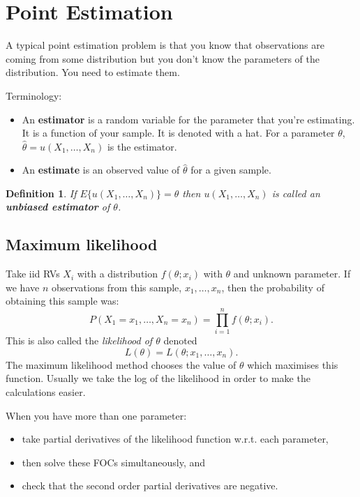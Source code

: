 \documentclass[10pt, two column]{article}
\newtheorem{definition}{Definition}[subsection]
\begin{document}
\section{Point Estimation}

A typical point estimation problem is that you know that observations are coming from some distribution but you don't know the parameters of the distribution. You need to estimate them. 

Terminology:
\begin{itemize}
\item An {\bf estimator} is a random variable for the parameter that you're estimating. It is a function of your sample. It is denoted with a hat. For a parameter $\theta$, $\widehat{\theta} = u(X_{1}, \dots, X_{n})$ is the estimator.
\item An {\bf estimate} is an observed value of $\widehat{\theta}$ for a given sample.\\ 
\end{itemize}

\begin{definition}
If $E\lbrace u(X_{1},\dots,X_{n}) \rbrace = \theta$ then $u(X_{1},\dots,X_{n})$ is called an {\bf unbiased estimator} of $\theta$. 
\end{definition}

\subsection{Maximum likelihood}

Take iid RVs $X_{i}$ with a distribution $f(\theta; x_{i})$ with $\theta$ and unknown parameter. If we have $n$ observations from this sample, $x_{1}, \dots, x_{n}$, then the probability of obtaining this sample was:
\[ P(X_{1} = x_{1}, \dots, X_{n} = x_{n}) = \prod_{i=1}^{n} f(\theta; x_{i}). \]
This is also called the \emph{likelihood of $\theta$} denoted
\[ L(\theta) = L(\theta;x_{1}, \dots, x_{n}). \]
The maximum likelihood method chooses the value of $\theta$ which maximises this function. Usually we take the log of the likelihood in order to make the calculations easier. 

When you have more than one parameter:
\begin{itemize}
\item take partial derivatives of the likelihood function w.r.t. each parameter,
\item then solve these FOCs simultaneously, and
\item check that the second order partial derivatives are negative.
\end{itemize}
\end{document}
